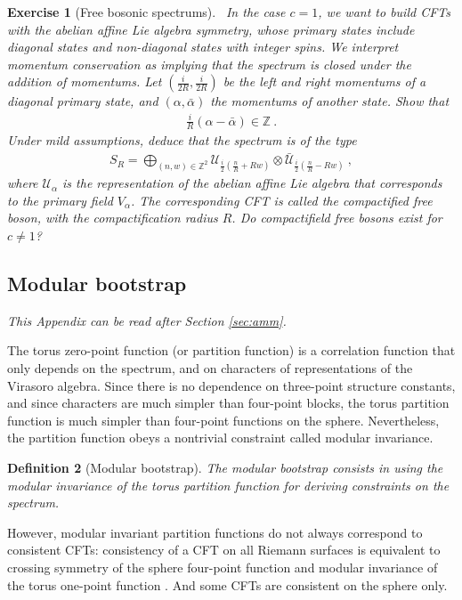 \documentclass[12pt, a4paper]{article}
\theoremstyle{break}
\newtheorem{exo}{Exercise}[section]
\newtheorem{defn}[exo]{Definition}
\begin{document}
\begin{exo}[Free bosonic spectrums]
~\label{exo:fbs}
In the case $c=1$, we want to build CFTs with the abelian affine Lie algebra symmetry, whose primary states include diagonal states and non-diagonal states with integer spins. We interpret momentum conservation as implying that the spectrum is closed under the addition of momentums. Let $(\frac{i}{2R},\frac{i}{2R})$ be the left and right momentums of a diagonal primary state, and $(\alpha,\bar\alpha)$ the momentums of another state. Show that 
\begin{align}
 \frac{i}{R}(\alpha-\bar\alpha)\in\mathbb{Z}\ .
\end{align}
Under mild assumptions, deduce that the spectrum is of the type 
 \begin{align}
 S_R = \bigoplus_{(n,w)\in {\mathbb{Z}^2}} \mathcal{U}_{\frac{i}{2}\left(\frac{n}{R} + Rw\right)} \otimes \bar{\mathcal{U}}_{\frac{i}{2}\left(\frac{n}{R} - Rw\right)} \ ,
\label{sr}
\end{align}
where $\mathcal{U}_\alpha$ is the representation of the abelian affine Lie algebra that corresponds to the primary field $V_\alpha$. The corresponding CFT is called the compactified free boson, with the compactification radius $R$. Do compactifield free bosons exist for $c\neq 1$?
\end{exo}


\subsection{Modular bootstrap}\label{sec:mb}

\textit{This Appendix can be read after Section \ref{sec:amm}.}

\vspace{2mm}

The torus zero-point function (or partition function) is a correlation function that only depends on the spectrum, and on characters of representations of the Virasoro algebra. Since there is no dependence on three-point structure constants, and since characters are much simpler than four-point blocks, the torus partition function is much simpler than four-point functions on the sphere. Nevertheless, the partition function obeys a nontrivial constraint called modular invariance.

\begin{defn}[Modular bootstrap]
The modular bootstrap consists in using the modular invariance of the torus partition function for deriving constraints on the spectrum.
\end{defn}
However, modular invariant partition functions do not always correspond to consistent CFTs: consistency of a CFT on all Riemann surfaces is equivalent to crossing symmetry of the sphere four-point function and modular invariance of the torus one-point function \cite{ms89b}. And some CFTs are consistent on the sphere only.
\end{document}
